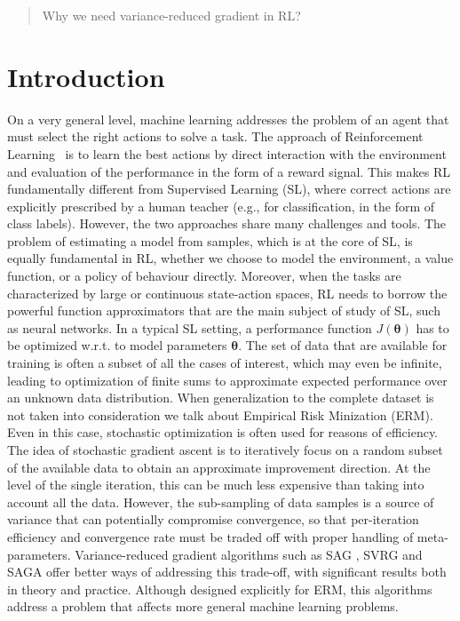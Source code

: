 \documentclass{article}
\makeatletter
\theoremstyle{remark}
\theoremstyle{definition}
\DeclareRobustCommand{\eg}{e.g.,\@\xspace}
\DeclareRobustCommand{\wrt}{w.r.t.\@\xspace}
\newcommand{\vtheta}{\boldsymbol{\theta}}
\makeatother
\begin{document}
\begin{abstract}
Why we need variance-reduced gradient in RL?
\end{abstract}

\section{Introduction}
On a very general level, machine learning addresses the problem of an agent that must select the right actions to solve a task. The approach of Reinforcement Learning~\citep{sutton1998reinforcement} is to learn the best actions by direct interaction with the environment and evaluation of the performance in the form of a reward signal. This makes RL fundamentally different from Supervised Learning (SL), where correct actions are explicitly prescribed by a human teacher (\eg for classification, in the form of class labels). However, the two approaches share many challenges and tools. The problem of estimating a model from samples, which is at the core of SL, is equally fundamental in RL, whether we choose to model the environment, a value function, or a policy of behaviour directly. Moreover, when the tasks are characterized by large or continuous state-action spaces, RL needs to borrow the powerful function approximators that are the main subject of study of SL, such as neural networks.
In a typical SL setting, a performance function $J(\vtheta)$ has to be optimized \wrt to model parameters $\vtheta$. The set of data that are available for training is often a subset of all the cases of interest, which may even be infinite, leading to optimization of finite sums to approximate expected performance over an unknown data distribution. When generalization to the complete dataset is not taken into consideration we talk about Empirical Risk Minization (ERM). Even in this case, stochastic optimization is often used for reasons of efficiency. The idea of stochastic gradient ascent \cite{nesterov2013introductory} is to iteratively focus on a random subset of the available data to obtain an approximate improvement direction. At the level of the single iteration, this can be much less expensive than taking into account all the data. However, the sub-sampling of data samples is a source of variance that can potentially compromise convergence, so that per-iteration efficiency and convergence rate must be traded off with proper handling of meta-parameters.
Variance-reduced gradient algorithms such as SAG \cite{roux2012stochastic}, SVRG \cite{johnson2013accelerating} and SAGA \cite{defazio2014saga} offer better ways of addressing this trade-off, with significant results both in theory and practice. Although designed explicitly for ERM, this algorithms address a problem that affects more general machine learning problems. 
\end{document}

